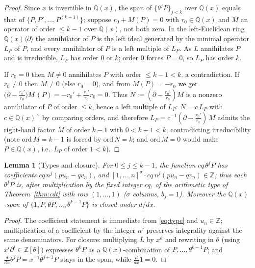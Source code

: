 \documentclass[11pt]{amsart}
\newtheorem{lemma}[theorem]{Lemma}
\theoremstyle{definition}
\theoremstyle{remark}
\newcommand{\Q}{\mathbb{Q}}
\newcommand{\Z}{\mathbb{Z}}
\newcommand{\lcm}[1]{[1,\dots,#1]}
\begin{document}
\begin{proof}
Since $x$ is invertible in $\Q(x)$, the span of
$\{\theta^jP\}_{j<k}$ over $\Q(x)$ equals that of
$\{P,P',\dots,P^{(k-1)}\}$; suppose
$r_0+M(P)=0$ with $r_0\in\Q(x)$ and $M$ an operator of order $\le k-1$
over $\Q(x)$, not both zero. In the left-Euclidean ring
$\Q(x)\langle\partial\rangle$ the annihilator of $P$ is the left ideal
generated by the minimal operator $L_P$ of $P$, and every annihilator
of $P$ is a left multiple of $L_P$. As $L$ annihilates $P$ and is
irreducible, $L_P$ has order $0$ or $k$; order $0$ forces $P=0$, so
$L_P$ has order $k$.

If $r_0=0$ then $M\ne0$ annihilates $P$ with order $\le k-1<k$, a
contradiction. If $r_0\ne0$ then $M\ne 0$ (else $r_0=0$), and from
$M(P)=-r_0$ we get
$\bigl(\partial-\tfrac{r_0'}{r_0}\bigr)M\,(P)=-r_0'+\tfrac{r_0'}{r_0}r_0=0$.
Thus $N:=(\partial-\tfrac{r_0'}{r_0})M$ is a nonzero annihilator of $P$
of order $\le k$, hence a left multiple of $L_P$:
$N=c\,L_P$ with $c\in\Q(x)^{\times}$ by comparing orders, and therefore
$L_P=c^{-1}(\partial-\tfrac{r_0'}{r_0})\,M$ admits the right-hand
factor $M$ of order $k-1$ with $0<k-1<k$, contradicting irreducibility
(note $\mathrm{ord}\,M=k-1$ is forced by $\mathrm{ord}\,N=k$; and
$\mathrm{ord}\,M=0$ would make $P\in\Q(x)$, i.e.\ $L_P$ of order
$1<k$).
\end{proof}

\begin{lemma}[Types and closure]\label{lem:types}
For $0\le j\le k-1$, the function $cq\,\theta^jP$ has coefficients
$cq\,n^j(pu_n-qv_n)$, and
$\lcm{n}^{\sigma}\cdot cq\,n^j(pu_n-qv_n)\in\Z$; thus each $\theta^jP$
is, after multiplication by the fixed integer $cq$, of the arithmetic
type of Theorem~\ref{thm:cdt} with row $(1,\dots,1)$ ($\sigma$ columns,
$b_j=1$). Moreover the $\Q(x)$-span of
$\{1,P,\theta P,\dots,\theta^{k-1}P\}$ is closed under $d/dx$.
\end{lemma}

\begin{proof}
The coefficient statement is immediate from \eqref{eq:type} and
$u_n\in\Z$; multiplication of a coefficient by the integer $n^j$
preserves integrality against the same denominators. For closure:
multiplying $L$ by $x^k$ and rewriting in $\theta$ (using
$x^i\partial^i\in\Z[\theta]$) expresses $\theta^kP$ as a
$\Q(x)$-combination of $P,\dots,\theta^{k-1}P$; and
$\frac{d}{dx}\theta^jP=x^{-1}\theta^{j+1}P$ stays in the span, while
$\frac{d}{dx}1=0$.
\end{proof}
\end{document}
